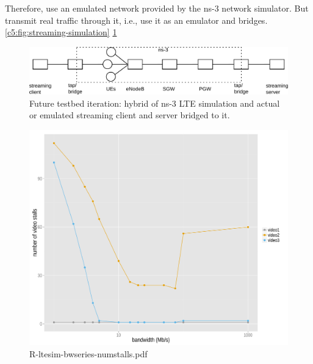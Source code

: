 Therefore, use an emulated network provided by the ns-3 network simulator. But transmit real traffic through it, i.e., use it as an emulator and bridges. \ref{c5:fig:streaming-simulation} \ref{c5:fig:streaming-hybrid}


\begin{figure}[htb]
\centering
\includegraphics[width=\textwidth]{images/streaming-hybrid.pdf}
\caption{Future testbed iteration: hybrid of ns-3 LTE simulation and actual or emulated streaming client and server bridged to it.}
\label{c5:fig:streaming-hybrid}
\end{figure}




\begin{figure}[htb]
\centering
\includegraphics[width=1.0\textwidth]{images/R-ltesim-bwseries-numstalls.pdf}
\caption{R-ltesim-bwseries-numstalls.pdf}
\label{c5:fig:ltesim-bwseries-numstalls}
\end{figure}

